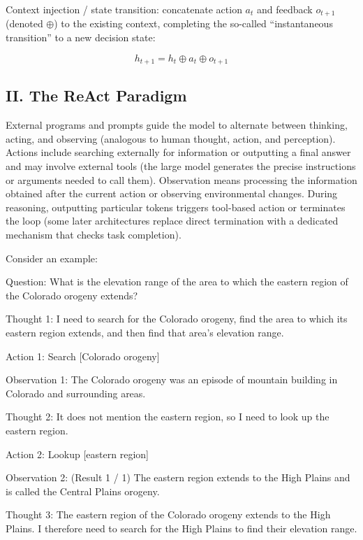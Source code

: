Context injection / state transition: concatenate action \(a_t\) and feedback \(o_{t+1}\) (denoted \(\oplus\)) to the existing context, completing the so-called ``instantaneous transition'' to a new decision state:

\[
h_{t+1}=h_t\oplus a_t\oplus o_{t+1}
\]

\hypertarget{ii.-the-react-paradigm}{%
\subsection{II. The ReAct Paradigm}\label{ii.-the-react-paradigm}}

External programs and prompts guide the model to alternate between thinking, acting, and observing (analogous to human thought, action, and perception). Actions include searching externally for information or outputting a final answer and may involve external tools (the large model generates the precise instructions or arguments needed to call them). Observation means processing the information obtained after the current action or observing environmental changes. During reasoning, outputting particular tokens triggers tool-based action or terminates the loop (some later architectures replace direct termination with a dedicated mechanism that checks task completion).

Consider an example:

Question: What is the elevation range of the area to which the eastern region of the Colorado orogeny extends?

Thought 1: I need to search for the Colorado orogeny, find the area to which its eastern region extends, and then find that area's elevation range.

Action 1: Search {[}Colorado orogeny{]}

Observation 1: The Colorado orogeny was an episode of mountain building in Colorado and surrounding areas.

Thought 2: It does not mention the eastern region, so I need to look up the eastern region.

Action 2: Lookup {[}eastern region{]}

Observation 2: (Result 1 / 1) The eastern region extends to the High Plains and is called the Central Plains orogeny.

Thought 3: The eastern region of the Colorado orogeny extends to the High Plains. I therefore need to search for the High Plains to find their elevation range.


